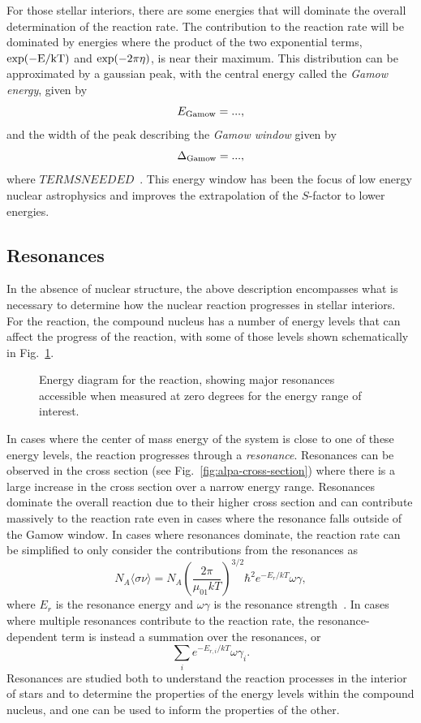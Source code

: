 For those stellar interiors, there are some energies that will dominate the
overall determination of the reaction rate. The contribution to the reaction
rate will be dominated by energies where the product of the two exponential
terms, $\rm{exp}(-E/kT)$ and $\rm{exp}(-2\pi\eta)$, is near their maximum. This
distribution can be approximated by a gaussian peak, with the central energy
called the \emph{Gamow energy}, given by
\[
    E_{\rm{Gamow}} = ...,
\]
and the width of the peak describing the \emph{Gamow window} given by
\[
    \Delta_{\rm{Gamow}} = ...,
\]
where $TERMS NEEDED$~\cite{Iliadis}. This energy window has been the focus of
low energy nuclear astrophysics and improves the extrapolation of the
$S$-factor to lower energies.

\subsection{Resonances}

In the absence of nuclear structure, the above description encompasses what is
necessary to determine how the nuclear reaction progresses in stellar
interiors. For the \alpa{} reaction, the compound nucleus  has a
number of energy levels that can affect the progress of the reaction, with
some of those levels shown schematically in Fig.~\ref{fig:alpa}.

\begin{figure}[t]
    \begin{center}
        \label{fig:alpa}
        \caption[Energy diagram for the \alpa{} reaction]{Energy diagram for
            the \alpa{} reaction, showing major resonances accessible when
            measured at zero degrees for the energy range of interest.}
    \end{center}
\end{figure}

In cases where the center of mass energy of the system is close to one of these
energy levels, the reaction progresses through a \emph{resonance}. Resonances
can be observed in the cross section (see Fig.~\ref{fig:alpa-cross-section})
where there is a large increase in the cross section over a narrow energy
range. Resonances dominate the overall reaction due to their higher cross
section and can contribute massively to the reaction rate even in cases where
the resonance falls outside of the Gamow window. In cases where resonances
dominate, the reaction rate can be simplified to only consider the
contributions from the resonances as
\[
    N_A\langle\sigma\nu\rangle = N_A\left(\frac{2\pi}{\mu_{01}kT}\right)^{3/2}
        \hbar^2e^{-E_r/kT}\omega\gamma,
\]
where $E_r$ is the resonance energy and $\omega\gamma$ is the resonance
strength~\cite{Iliadis}. In cases where multiple resonances contribute to the
reaction rate, the resonance-dependent term is instead a summation over the
resonances, or
\[
    \sum_i e^{-E_{r,i}/kT}\omega\gamma_i.
\]
Resonances are studied both to understand the reaction processes in the
interior of stars and to determine the properties of the energy levels within
the compound nucleus, and one can be used to inform the properties of the
other.


